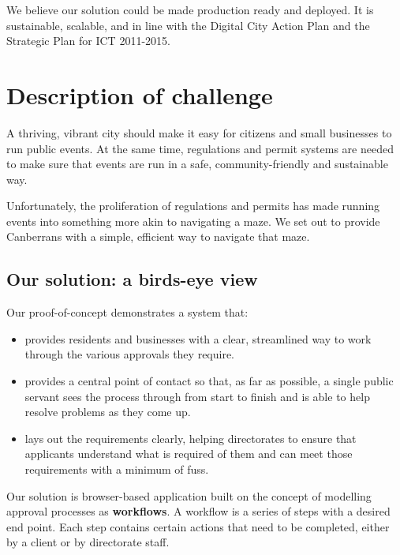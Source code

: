 \documentclass[12pt,a4paper,twosided]{article}
\begin{document}
We believe our solution could be made production ready and deployed. It
is sustainable, scalable, and in line with the Digital City Action Plan
and the Strategic Plan for ICT 2011-2015.

\newpage
\section{Description of challenge}

A thriving, vibrant city should make it easy for citizens and small
businesses to run public events. At the same time, regulations and
permit systems are needed to make sure that events are run in a safe,
community-friendly and sustainable way.

Unfortunately, the proliferation of regulations and permits has made
running events into something more akin to navigating a maze. We set out
to provide Canberrans with a simple, efficient way to navigate that
maze.

\subsection{Our solution: a birds-eye view}

Our proof-of-concept demonstrates a system that:

\begin{itemize}

\item
  provides residents and businesses with a clear, streamlined way to
  work through the various approvals they require.
\item
  provides a central point of contact so that, as far as possible, a
  single public servant sees the process through from start to finish
  and is able to help resolve problems as they come up.
\item
  lays out the requirements clearly, helping directorates to ensure that
  applicants understand what is required of them and can meet those
  requirements with a minimum of fuss.
\end{itemize}

Our solution is browser-based application built on the concept of
modelling approval processes as \textbf{workflows}. A workflow is a
series of steps with a desired end point. Each step contains certain
actions that need to be completed, either by a client or by directorate
staff.
\end{document}
